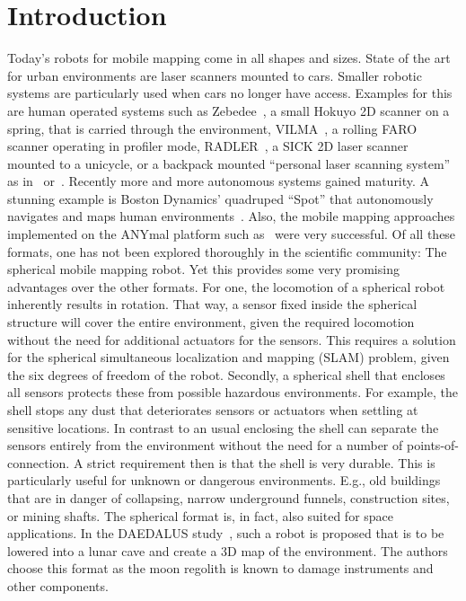 \section{Introduction}

Today's robots for mobile mapping come in all shapes and sizes.
State of the art for urban environments are laser scanners mounted to cars.
Smaller robotic systems are particularly used when cars no longer have access.
Examples for this are human operated systems such as Zebedee~\cite{Bosse2012-zebedee}, a small Hokuyo 2D scanner on a spring, that is carried through the environment, VILMA~\cite{JPRS2016}, a rolling FARO scanner operating in profiler mode, RADLER~\cite{Borrmann2020-RADLER}, a SICK 2D laser scanner mounted to a unicycle, or a backpack mounted ``personal laser scanning system'' as in~\cite{LauterbackEtAl2015-Backpack} or~\cite{WWWLeicaBackpack}.
Recently more and more autonomous systems gained maturity.
A stunning example is Boston Dynamics' quadruped ``Spot'' that autonomously navigates and maps human environments~\cite{SpotRobot}.
Also, the mobile mapping approaches implemented on the ANYmal platform such as~\cite{Fankhauser2018-ANYmal} were very successful.
Of all these formats, one has not been explored thoroughly in the scientific community: The spherical mobile mapping robot.
Yet this provides some very promising advantages over the other formats.
For one, the locomotion of a spherical robot inherently results in rotation.
That way, a sensor fixed inside the spherical structure will cover the entire environment, given the required locomotion without the need for additional actuators for the sensors.
This requires a solution for the spherical simultaneous localization and mapping (SLAM) problem, given the six degrees of freedom of the robot.
Secondly, a spherical shell that encloses all sensors protects these from possible hazardous environments.  
For example, the shell stops any dust that deteriorates sensors or actuators when settling at sensitive locations.
In contrast to an usual enclosing the shell can separate the sensors entirely from the environment without the need for a number of points-of-connection. 
A strict requirement then is that the shell is very durable.
This is particularly useful for unknown or dangerous environments.
E.g., old buildings that are in danger of collapsing, narrow underground funnels, construction sites, or mining shafts. 
The spherical format is, in fact, also suited for space applications.
In the DAEDALUS study~\cite{RossiMaurelliUnnithanetal.2021}, such a robot is proposed that is to be lowered into a lunar cave and create a 3D map of the environment. The authors choose this format as the moon regolith is known to damage instruments and other components.
